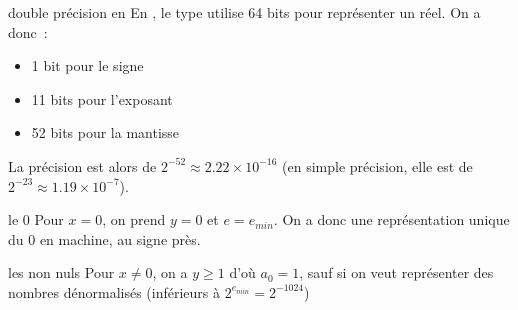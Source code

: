 \begin{exemple}{}{double précision en }
En , le type  utilise 64 bits pour représenter un réel. On a donc~:
\begin{itemize}
    \item 1 bit pour le signe
    \item 11 bits pour l'exposant
    \item 52 bits pour la mantisse
\end{itemize}
La précision est alors de $2^{-52} \approx 2.22 \times 10^{-16}$ (en simple précision, elle est de $2^{-23} \approx 1.19 \times 10^{-7}$).\\
\end{exemple}
\begin{remarque}{}{le 0}
    Pour $x=0$, on prend $y=0$ et $e=e_{min}$. On a donc une représentation unique du 0 en machine, au signe près.
\end{remarque}

\begin{remarque}{}{les non nuls}
    Pour $x\neq 0$, on a $y\geq 1$ d'où $a_0 = 1$, sauf si on veut représenter des nombres dénormalisés (inférieurs à  $2^{e_{min}}=2^{-1024}$)
\end{remarque}
